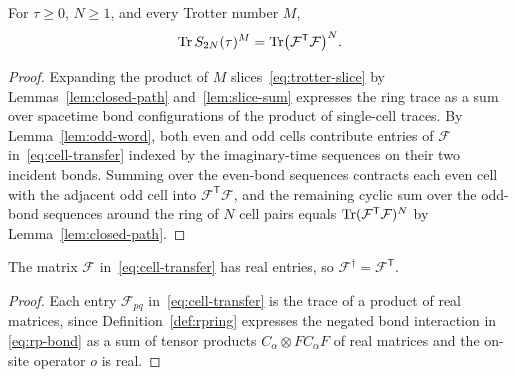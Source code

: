 \begin{theorem}
  \label{thm:transfer-factorization}
  \leanok
  For \(\tau \ge 0\), \(N \ge 1\), and every Trotter number \(M\),
  \begin{equation}
    \label{eq:transfer-factorization}
    \operatorname{Tr} S_{2N}(\tau)^M = \operatorname{Tr} \bigl(\mathcal F^{\mathsf T} \mathcal F\bigr)^N .
  \end{equation}
\end{theorem}
\begin{proof}
  \leanok
  Expanding the product of \(M\) slices~\eqref{eq:trotter-slice} by Lemmas~\ref{lem:closed-path}
  and~\ref{lem:slice-sum} expresses the ring trace as a sum over spacetime bond configurations of
  the product of single-cell traces. By Lemma~\ref{lem:odd-word}, both even and odd cells contribute
  entries of \(\mathcal F\) in~\eqref{eq:cell-transfer} indexed by the imaginary-time sequences on
  their two incident bonds. Summing over the even-bond sequences contracts each even cell with the
  adjacent odd cell into \(\mathcal F^{\mathsf T} \mathcal F\), and the remaining cyclic sum over
  the odd-bond sequences around the ring of \(N\) cell pairs equals
  \(\operatorname{Tr} (\mathcal F^{\mathsf T}\mathcal F)^N\) by Lemma~\ref{lem:closed-path}.
\end{proof}

\begin{lemma}
  \label{lem:real-transfer}
  \leanok
  The matrix \(\mathcal F\) in~\eqref{eq:cell-transfer} has real entries, so
  \(\mathcal F^\dagger = \mathcal F^{\mathsf T}\).
\end{lemma}
\begin{proof}
  \leanok
  Each entry \(\mathcal F_{pq}\) in~\eqref{eq:cell-transfer} is the trace of a product of real
  matrices, since Definition~\ref{def:rpring} expresses the negated bond interaction in
  \eqref{eq:rp-bond} as a sum of tensor products \(C_\alpha \otimes F C_\alpha F\) of real matrices
  and the on-site operator \(o\) is real.
\end{proof}

